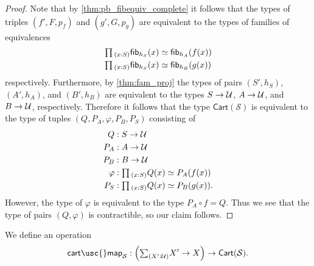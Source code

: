 \begin{proof}
Note that by \cref{thm:pb_fibequiv_complete} it follows that the types of triples $(f',F,p_f)$ and $(g',G,p_g)$ are equivalent to the types of families of equivalences
\begin{align*}
& \prd{x:S}\eqv{\fib{h_S}{x}}{\fib{h_A}{f(x)}} \\
& \prd{x:S}\eqv{\fib{h_S}{x}}{\fib{h_B}{g(x)}}
\end{align*} 
respectively. Furthermore, by \cref{thm:fam_proj} the types of pairs $(S',h_S)$, $(A',h_A)$, and $(B',h_B)$ are equivalent to the types $S\to \mathcal{U}$, $A\to \mathcal{U}$, and $B\to \mathcal{U}$, respectively. Therefore it follows that the type $\mathsf{Cart}(\mathcal{S})$ is equivalent to the type of tuples $(Q,P_A,\varphi,P_B,P_S)$ consisting of
\begin{align*}
Q & : S\to \UU \\
P_A & : A \to \UU \\
P_B & : B \to \UU \\
\varphi & : \prd{x:S}\eqv{Q(x)}{P_A(f(x))} \\
P_S & : \prd{x:S}\eqv{Q(x)}{P_B(g(x))}.
\end{align*}
However, the type of $\varphi$ is equivalent to the type $P_A\circ f=Q$. Thus we see that the type of pairs $(Q,\varphi)$ is contractible, so our claim follows.
\end{proof}

\begin{defn}
We define an operation
\begin{equation*}
\mathsf{cart\usc{}map}_{\mathcal{S}}:{\Big(\sm{X':\UU}X'\to X\Big)}\to \mathsf{Cart}(\mathcal{S}).
\end{equation*}
\end{defn}

